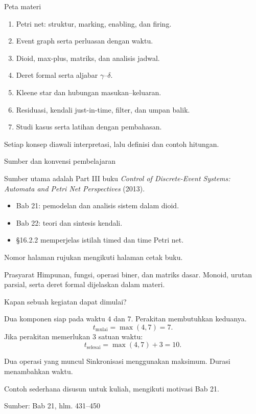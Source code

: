 \documentclass[aspectratio=169,11pt]{beamer}
\newcommand{\source}[1]{%
    \vfill
    \hfill{\tiny\color{gray}Sumber: #1}
}
\begin{document}
\begin{frame}{Peta materi}

\begin{enumerate}
\item Petri net: struktur, marking, enabling, dan firing.
\item Event graph serta perluasan dengan waktu.
\item Dioid, max-plus, matriks, dan analisis jadwal.
\item Deret formal serta aljabar $\gamma$--$\delta$.
\item Kleene star dan hubungan masukan--keluaran.
\item Residuasi, kendali just-in-time, filter, dan umpan balik.
\item Studi kasus serta latihan dengan pembahasan.
\end{enumerate}
Setiap konsep diawali interpretasi, lalu definisi dan contoh hitungan.

\end{frame}
\begin{frame}{Sumber dan konvensi pembelajaran}

Sumber utama adalah Part III buku \textit{Control of Discrete-Event Systems:
Automata and Petri Net Perspectives} (2013).
\begin{itemize}
\item Bab 21: pemodelan dan analisis sistem dalam dioid.
\item Bab 22: teori dan sintesis kendali.
\item \S16.2.2 memperjelas istilah timed dan time Petri net.
\end{itemize}
Nomor halaman rujukan mengikuti halaman cetak buku.
\begin{block}{Prasyarat}
Himpunan, fungsi, operasi biner, dan matriks dasar.
Monoid, urutan parsial, serta deret formal dijelaskan dalam materi.
\end{block}

\end{frame}
\begin{frame}{Kapan sebuah kegiatan dapat dimulai?}


Dua komponen siap pada waktu $4$ dan $7$. Perakitan membutuhkan keduanya.
\[
t_{\mathrm{mulai}}=\max(4,7)=7.
\]
Jika perakitan memerlukan $3$ satuan waktu:
\[
t_{\mathrm{selesai}}=\max(4,7)+3=10.
\]
\begin{block}{Dua operasi yang muncul}
Sinkronisasi menggunakan maksimum. Durasi menambahkan waktu.
\end{block}
Contoh sederhana disusun untuk kuliah, mengikuti motivasi Bab 21.

\source{Bab 21, hlm. 431--450}

\end{frame}
\end{document}
